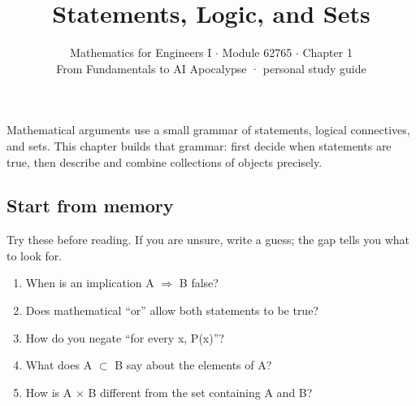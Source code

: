 \documentclass[11pt]{article}
\title{\sffamily\bfseries\color{FAUblue}Statements, Logic, and Sets}
\author{Mathematics for Engineers I \ensuremath{\cdot} Module 62765 \ensuremath{\cdot} Chapter 1\\[2pt]\small From Fundamentals to AI Apocalypse · personal study guide}
\date{}
\begin{document}
\maketitle
\begingroup\footnotesize\setlength{\parskip}{0pt}\tableofcontents\endgroup
\clearpage

{\large Mathematical arguments use a small grammar of statements, logical connectives, and sets. This chapter builds that grammar: first decide when statements are true, then describe and combine collections of objects precisely.}


\begin{keepsection}
\section{Start from memory}

Try these before reading. If you are unsure, write a guess; the gap tells you what to look for.

\begin{enumerate}
\item When is an implication A \ensuremath{\Rightarrow} B false?
\item Does mathematical “or” allow both statements to be true?
\item How do you negate “for every x, P(x)”?
\item What does A \ensuremath{\subset} B say about the elements of A?
\item How is A \ensuremath{\times} B different from the set containing A and B?
\end{enumerate}

\end{keepsection}
\end{document}
